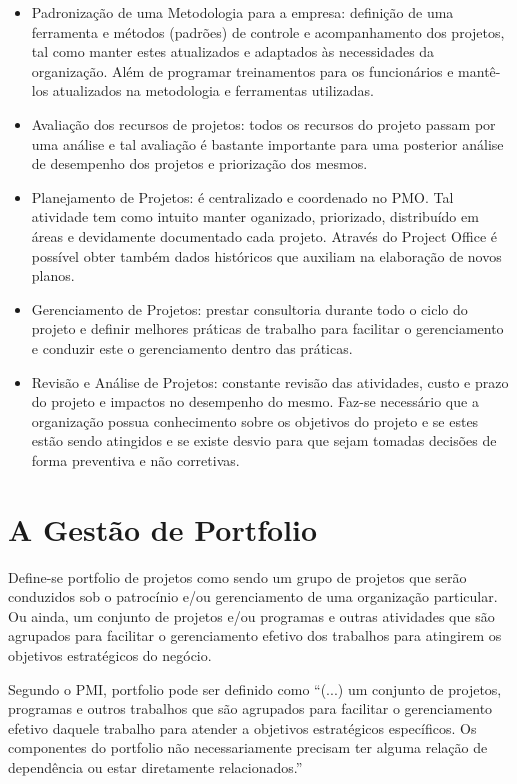 \documentclass[12pt,a4paper,ruledheader,tocpage=prefix,floatnumber=continuous,pagestart=folhaderosto,font=times]{abnt}
\begin{document}
\begin{itemize}
 \item Padronização de uma Metodologia para a empresa: definição de uma ferramenta e métodos (padrões) de controle e acompanhamento dos projetos, tal como
       manter estes atualizados e adaptados às necessidades da organização. Além de programar treinamentos para os funcionários e mantê-los atualizados
       na metodologia e ferramentas utilizadas.
 \item Avaliação dos recursos de projetos: todos os recursos do projeto passam por uma análise e tal avaliação é bastante importante para uma posterior 
       análise de desempenho dos projetos e priorização dos mesmos.
 \item Planejamento de Projetos: é centralizado e coordenado no PMO. Tal atividade tem como intuito manter oganizado, priorizado, distribuído em áreas
       e devidamente documentado cada projeto. Através do Project Office é possível obter também dados históricos que auxiliam na elaboração de novos planos.
 \item Gerenciamento de Projetos: prestar consultoria durante todo o ciclo do projeto e definir melhores práticas de trabalho para facilitar o gerenciamento
       e conduzir este o gerenciamento dentro das práticas.
 \item Revisão e Análise de Projetos: constante revisão das atividades, custo e prazo do projeto e impactos no desempenho do mesmo. Faz-se necessário que
       a organização possua conhecimento sobre os objetivos do projeto e se estes estão sendo atingidos e se existe desvio para que sejam tomadas decisões
       de forma preventiva e não corretivas.
\end{itemize}

\chapter{A Gestão de Portfolio}
Define-se portfolio de projetos como sendo um grupo de projetos que serão conduzidos sob o patrocínio e/ou gerenciamento de uma organização particular.  
Ou ainda, um conjunto de projetos e/ou programas e outras atividades que são agrupados para facilitar o gerenciamento efetivo dos trabalhos para 
atingirem os objetivos estratégicos do negócio.

Segundo o PMI, portfolio pode ser definido como ``(...) um conjunto de projetos, programas e outros trabalhos que são 
agrupados para facilitar o gerenciamento efetivo daquele trabalho para atender a objetivos estratégicos específicos. Os componentes do portfolio não 
necessariamente precisam ter alguma relação de dependência ou estar diretamente relacionados.''
\end{document}
